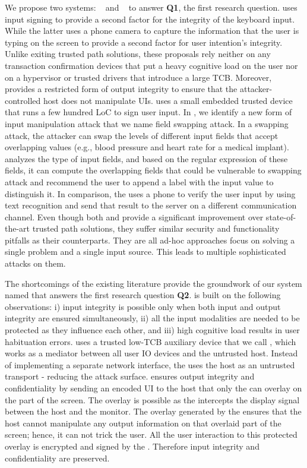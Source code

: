  We propose two systems: \integrikey~\cite{integrikey} and \integriscreen~\cite{integriscreen} to answer \textbf{Q1}, the first research question. \integrikey uses input signing to provide a second factor for the integrity of the keyboard input. While the latter uses a phone camera to capture the information that the user is typing on the screen to provide a second factor for user intention's integrity. Unlike exiting trusted path solutions, these proposals rely neither on any transaction confirmation devices that put a heavy cognitive load on the user nor on a hypervisor or trusted drivers that introduce a large TCB. Moreover, \integriscreen provides a restricted form of output integrity to ensure that the attacker-controlled host does not manipulate UIs. \integrikey uses a small embedded trusted device that runs a few hundred LoC to sign user input. In \integrikey, we identify a new form of input manipulation attack that we name field swapping attack. In a swapping attack, the attacker can swap the levels of different input fields that accept overlapping values (e.g., blood pressure and heart rate for a medical implant). \integrikey analyzes the type of input fields, and based on the regular expression of these fields, it can compute the overlapping fields that could be vulnerable to swapping attack and recommend the user to append a label with the input value to distinguish it. 
In comparison, the \integriscreen uses a phone to verify the user input by using text recognition and send that result to the server on a different communication channel. Even though both \integrikey and \integriscreen provide a significant improvement over state-of-the-art trusted path solutions, they suffer similar security and functionality pitfalls as their counterparts. They are all ad-hoc approaches focus on solving a single problem and a single input source. This leads to multiple sophisticated attacks on them.

The shortcomings of the existing literature provide the groundwork of our system named \protection that answers the first research question \textbf{Q2}.
\protection is built on the following observations: i) input integrity is possible only when both input and output integrity are ensured simultaneously, ii) all the input modalities are needed to be protected as they influence each other, and iii) high cognitive load results in user habituation errors. \protection uses a trusted low-TCB auxiliary device that we call \deviceprotection, which works as a mediator between all user IO devices and the untrusted host. Instead of implementing a separate network interface, the \deviceprotection uses the host as an untrusted transport - reducing the attack surface. \protection ensures output integrity and confidentiality by sending an encoded UI to the host that only the \deviceprotection can overlay on the part of the screen. The overlay is possible as the \deviceprotection intercepts the display signal between the host and the monitor. The overlay generated by the \deviceprotection ensures that the host cannot manipulate any output information on that overlaid part of the screen; hence, it can not trick the user. All the user interaction to this protected overlay is encrypted and signed by the \deviceprotection. Therefore input integrity and confidentiality are preserved.

